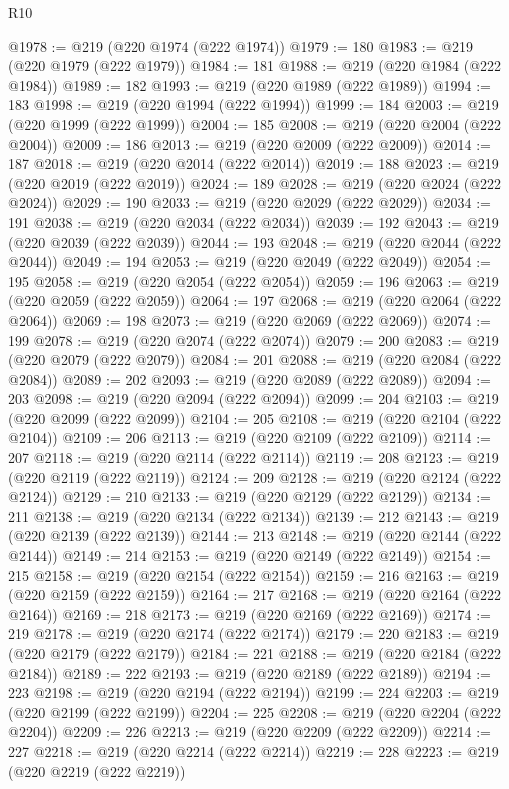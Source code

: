 \begin{lexlean}{R10}
\begin{coremodule}
@1978 := @219 (@220 @1974 (@222 @1974))
@1979 := 180
@1983 := @219 (@220 @1979 (@222 @1979))
@1984 := 181
@1988 := @219 (@220 @1984 (@222 @1984))
@1989 := 182
@1993 := @219 (@220 @1989 (@222 @1989))
@1994 := 183
@1998 := @219 (@220 @1994 (@222 @1994))
@1999 := 184
@2003 := @219 (@220 @1999 (@222 @1999))
@2004 := 185
@2008 := @219 (@220 @2004 (@222 @2004))
@2009 := 186
@2013 := @219 (@220 @2009 (@222 @2009))
@2014 := 187
@2018 := @219 (@220 @2014 (@222 @2014))
@2019 := 188
@2023 := @219 (@220 @2019 (@222 @2019))
@2024 := 189
@2028 := @219 (@220 @2024 (@222 @2024))
@2029 := 190
@2033 := @219 (@220 @2029 (@222 @2029))
@2034 := 191
@2038 := @219 (@220 @2034 (@222 @2034))
@2039 := 192
@2043 := @219 (@220 @2039 (@222 @2039))
@2044 := 193
@2048 := @219 (@220 @2044 (@222 @2044))
@2049 := 194
@2053 := @219 (@220 @2049 (@222 @2049))
@2054 := 195
@2058 := @219 (@220 @2054 (@222 @2054))
@2059 := 196
@2063 := @219 (@220 @2059 (@222 @2059))
@2064 := 197
@2068 := @219 (@220 @2064 (@222 @2064))
@2069 := 198
@2073 := @219 (@220 @2069 (@222 @2069))
@2074 := 199
@2078 := @219 (@220 @2074 (@222 @2074))
@2079 := 200
@2083 := @219 (@220 @2079 (@222 @2079))
@2084 := 201
@2088 := @219 (@220 @2084 (@222 @2084))
@2089 := 202
@2093 := @219 (@220 @2089 (@222 @2089))
@2094 := 203
@2098 := @219 (@220 @2094 (@222 @2094))
@2099 := 204
@2103 := @219 (@220 @2099 (@222 @2099))
@2104 := 205
@2108 := @219 (@220 @2104 (@222 @2104))
@2109 := 206
@2113 := @219 (@220 @2109 (@222 @2109))
@2114 := 207
@2118 := @219 (@220 @2114 (@222 @2114))
@2119 := 208
@2123 := @219 (@220 @2119 (@222 @2119))
@2124 := 209
@2128 := @219 (@220 @2124 (@222 @2124))
@2129 := 210
@2133 := @219 (@220 @2129 (@222 @2129))
@2134 := 211
@2138 := @219 (@220 @2134 (@222 @2134))
@2139 := 212
@2143 := @219 (@220 @2139 (@222 @2139))
@2144 := 213
@2148 := @219 (@220 @2144 (@222 @2144))
@2149 := 214
@2153 := @219 (@220 @2149 (@222 @2149))
@2154 := 215
@2158 := @219 (@220 @2154 (@222 @2154))
@2159 := 216
@2163 := @219 (@220 @2159 (@222 @2159))
@2164 := 217
@2168 := @219 (@220 @2164 (@222 @2164))
@2169 := 218
@2173 := @219 (@220 @2169 (@222 @2169))
@2174 := 219
@2178 := @219 (@220 @2174 (@222 @2174))
@2179 := 220
@2183 := @219 (@220 @2179 (@222 @2179))
@2184 := 221
@2188 := @219 (@220 @2184 (@222 @2184))
@2189 := 222
@2193 := @219 (@220 @2189 (@222 @2189))
@2194 := 223
@2198 := @219 (@220 @2194 (@222 @2194))
@2199 := 224
@2203 := @219 (@220 @2199 (@222 @2199))
@2204 := 225
@2208 := @219 (@220 @2204 (@222 @2204))
@2209 := 226
@2213 := @219 (@220 @2209 (@222 @2209))
@2214 := 227
@2218 := @219 (@220 @2214 (@222 @2214))
@2219 := 228
@2223 := @219 (@220 @2219 (@222 @2219))

\end{coremodule}
\end{lexlean}
